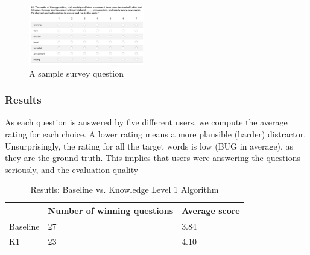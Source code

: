 


\begin{figure}[ht]
   \centering
   \includegraphics[width=0.45\textwidth]{distractor_1.jpg}
   \caption{A sample survey question}
   \label{fig:distractor_1}
\end{figure}

\subsubsection{Results}
As each question is answered by five different users, we compute the average rating for each choice. A lower rating means a more plausible (harder) distractor. 
Unsurprisingly, the rating for all the target words is low (BUG in average), as they are the ground truth. This implies that users were answering the questions seriously, and the evaluation quality 



\begin{table}[ht]
    \caption{ Resutls: Baseline vs. Knowledge Level 1 Algorithm}
    \label{table:distractor_1}
    \begin{center}
    \begin{tabular}{| p{1.5cm} | p{2.5cm} | p{2.2cm} |}
        \hline
         & Number of winning questions & Average score\\
        \hline
        Baseline & 27 & 3.84\\
        \hline
        K1 & 23 & 4.10\\
        \hline
    \end{tabular}
    \end{center}
\end{table}

